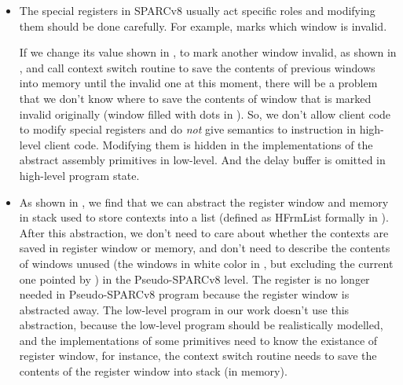 \begin{itemize}
    \item 
    The special registers in SPARCv8 usually act specific 
    roles and modifying them should be done carefully. 
    For example, \regwim{} marks which window is invalid.
    \begin{center}
        \vspace*{-0.5em}
        
        \vspace*{-0.5em}
        \label{fig:problem of modifying wim arbitrary}
    \end{center}
    If we change its value shown in 
    \Fig{\ref{fig:Abstraction of Register Windows and Memory}}, 
    to mark another window invalid, as shown in 
    \Fig{\ref{fig:problem of modifying wim arbitrary}}, 
    and call context switch routine to  
    save the contents of previous windows into memory
    until the invalid one at this moment,  
    there will be a problem that we don't know 
    where to save the contents of window that 
    is marked invalid originally 
    (window filled with dots in \Fig{\ref{fig:problem of modifying wim arbitrary}}). 
    So, we don't allow client code 
    to modify special registers and do \textit{not} 
    give semantics to \cwr{} instruction in high-level 
    client code. Modifying them is hidden in the 
    implementations of the abstract assembly primitives
    in low-level. 
    And the delay buffer is omitted in high-level
    program state. 
    \item 
    As shown in \Fig{\ref{fig:Abstraction of Register Windows and Memory}}, 
    we find that we can abstract the register window 
    and memory in stack used to store contexts 
    into a list (defined as 
    HFrmList formally in \Fig{\ref{fig:machine-state-concur-pseudo-sparc}}).  
    After this abstraction, we don't need to care about 
    whether the contexts are saved in register window or 
    memory, and don't need to describe the contents of windows unused 
    (the windows in white color in 
    \Fig{\ref{fig:Abstraction of Register Windows and Memory}}, 
    but excluding the current one pointed by \regcwp{}) 
    in the Pseudo-SPARCv8 level. 
    The \regcwp{} register is no longer needed in 
    Pseudo-SPARCv8 program because the register window 
    is abstracted away. 
    The low-level program in our work doesn't use this 
    abstraction, because the low-level program 
    should be realistically modelled, 
    and the implementations of some primitives 
    need to know the existance of register window,  
    for instance, the context switch routine 
    needs to save the contents 
    of the register window into stack (in memory).
\end{itemize}

